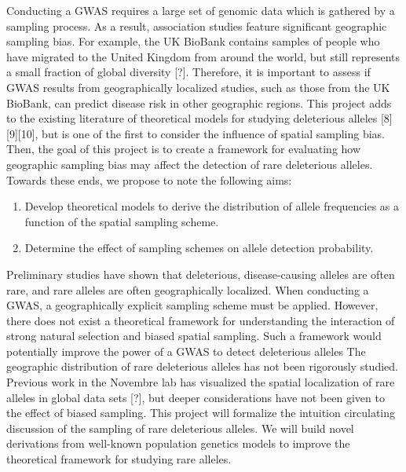 Conducting a GWAS requires a large set of genomic data which is gathered by a sampling process. As a result, association studies feature significant geographic sampling bias. For example, the UK BioBank contains samples of people who have migrated to the United Kingdom from around the world, but still represents a small fraction of global diversity [?]. Therefore, it is important to assess if GWAS results from geographically localized studies, such as those from the UK BioBank, can predict disease risk in other geographic regions. This project adds to the existing literature of theoretical models for studying deleterious alleles [8][9][10], but is one of the first to consider the influence of spatial sampling bias. Then, the goal of this project is to create a framework for evaluating how geographic sampling bias may affect the detection of rare deleterious alleles. Towards these ends, we propose to note the following aims:	

\begin{enumerate}
    \item Develop theoretical models to derive the distribution of allele frequencies as a function of the spatial sampling scheme.
    \item Determine the effect of sampling schemes on allele detection probability.
\end{enumerate}


Preliminary studies have shown that deleterious, disease-causing alleles are often rare, and rare alleles are often geographically localized. When conducting a GWAS, a geographically explicit sampling scheme must be applied. However, there does not exist a theoretical framework for understanding the interaction of strong natural selection and biased spatial sampling. Such a framework would potentially improve the power of a GWAS to detect deleterious alleles
The geographic distribution of rare deleterious alleles has not been rigorously studied. Previous work in the Novembre lab has visualized the spatial localization of rare alleles in global data sets [?], but deeper considerations have not been given to the effect of biased sampling. This project will formalize the intuition circulating discussion of the sampling of rare deleterious alleles. We will build novel derivations from well-known population genetics models to improve the theoretical framework for studying rare alleles. 


